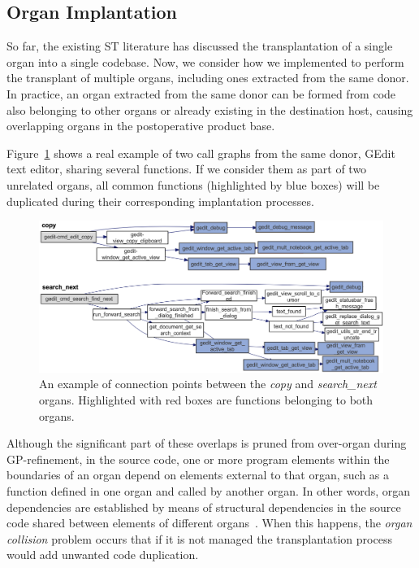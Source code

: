\subsection{Organ Implantation}

So far, the existing ST literature has discussed the transplantation of a single organ into a single codebase. Now, we consider how we implemented \autoscalpel to perform the transplant of multiple organs, including ones extracted from the same donor. In practice, an organ extracted from the same donor can be formed from code also belonging to other organs or already existing in the destination host, causing overlapping organs in the postoperative product base. 

Figure~\ref{fig:organs_connection_point} shows a real example of two call graphs from the same donor, GEdit text editor, sharing several functions. If we consider them as part of two unrelated organs, all common functions (highlighted by blue boxes) will be duplicated during their corresponding implantation processes.

\begin{figure}[t]
	\centering \includegraphics[width=\linewidth]{images/organs_dependency2.png}
	\caption{An example of connection points between the \emph{copy} and \emph{search\_next} organs. Highlighted with red boxes are functions belonging to both organs.}
	\label{fig:organs_connection_point}
\end{figure} 

Although the significant part of these overlaps is pruned from over-organ during GP-refinement, in the source code, one or more program elements within the boundaries of an organ depend on elements external to that organ, such as a function defined in one organ and called by another organ. In other words, organ dependencies are established by means of structural dependencies in the source code shared between elements of different organs~\cite{CafeoA2016}. When this happens, the \emph{organ collision} problem occurs that if it is not managed the transplantation process would add unwanted code duplication.

